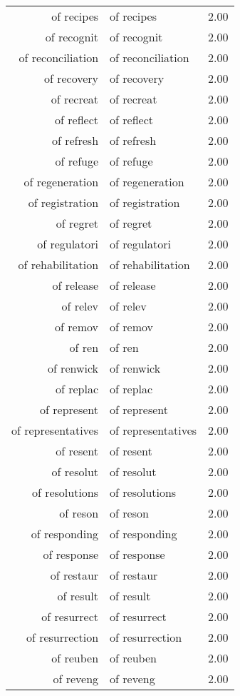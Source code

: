 \begin{table}[ht]
\begin{tabular}{rlr}
  of recipes & of recipes & 2.00 \\ 
  of recognit & of recognit & 2.00 \\ 
  of reconciliation & of reconciliation & 2.00 \\ 
  of recovery & of recovery & 2.00 \\ 
  of recreat & of recreat & 2.00 \\ 
  of reflect & of reflect & 2.00 \\ 
  of refresh & of refresh & 2.00 \\ 
  of refuge & of refuge & 2.00 \\ 
  of regeneration & of regeneration & 2.00 \\ 
  of registration & of registration & 2.00 \\ 
  of regret & of regret & 2.00 \\ 
  of regulatori & of regulatori & 2.00 \\ 
  of rehabilitation & of rehabilitation & 2.00 \\ 
  of release & of release & 2.00 \\ 
  of relev & of relev & 2.00 \\ 
  of remov & of remov & 2.00 \\ 
  of ren & of ren & 2.00 \\ 
  of renwick & of renwick & 2.00 \\ 
  of replac & of replac & 2.00 \\ 
  of represent & of represent & 2.00 \\ 
  of representatives & of representatives & 2.00 \\ 
  of resent & of resent & 2.00 \\ 
  of resolut & of resolut & 2.00 \\ 
  of resolutions & of resolutions & 2.00 \\ 
  of reson & of reson & 2.00 \\ 
  of responding & of responding & 2.00 \\ 
  of response & of response & 2.00 \\ 
  of restaur & of restaur & 2.00 \\ 
  of result & of result & 2.00 \\ 
  of resurrect & of resurrect & 2.00 \\ 
  of resurrection & of resurrection & 2.00 \\ 
  of reuben & of reuben & 2.00 \\ 
  of reveng & of reveng & 2.00 \\ 

\end{tabular}
\end{table}
